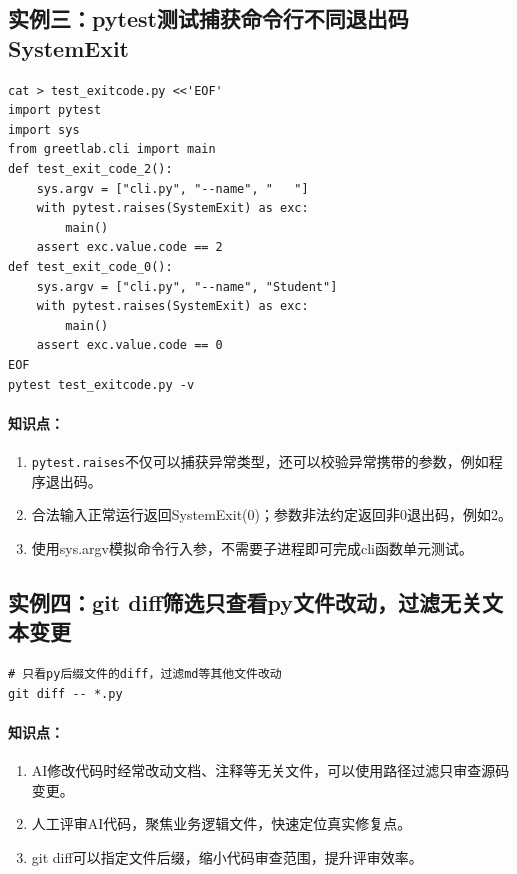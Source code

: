 \documentclass{article}
\begin{document}
\subsection*{实例三：pytest测试捕获命令行不同退出码SystemExit}
\begin{lstlisting}
cat > test_exitcode.py <<'EOF'
import pytest
import sys
from greetlab.cli import main
def test_exit_code_2():
    sys.argv = ["cli.py", "--name", "   "]
    with pytest.raises(SystemExit) as exc:
        main()
    assert exc.value.code == 2
def test_exit_code_0():
    sys.argv = ["cli.py", "--name", "Student"]
    with pytest.raises(SystemExit) as exc:
        main()
    assert exc.value.code == 0
EOF
pytest test_exitcode.py -v
\end{lstlisting}
\paragraph{知识点：}
\begin{enumerate}
\item \texttt{pytest.raises}不仅可以捕获异常类型，还可以校验异常携带的参数，例如程序退出码。
\item 合法输入正常运行返回SystemExit(0)；参数非法约定返回非0退出码，例如2。
\item 使用sys.argv模拟命令行入参，不需要子进程即可完成cli函数单元测试。
\end{enumerate}
\subsection*{实例四：git diff筛选只查看py文件改动，过滤无关文本变更}
\begin{lstlisting}
# 只看py后缀文件的diff，过滤md等其他文件改动
git diff -- *.py
\end{lstlisting}
\paragraph{知识点：}
\begin{enumerate}
\item AI修改代码时经常改动文档、注释等无关文件，可以使用路径过滤只审查源码变更。
\item 人工评审AI代码，聚焦业务逻辑文件，快速定位真实修复点。
\item git diff可以指定文件后缀，缩小代码审查范围，提升评审效率。
\end{enumerate}
\end{document}
